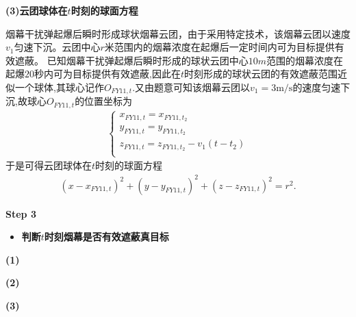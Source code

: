 \documentclass[../main.tex]{subfiles}
\begin{document}
\noindent \textbf{(3)云团球体在$t$时刻的球面方程 }
\par 烟幕干扰弹起爆后瞬时形成球状烟幕云团，由于采用特定技术，该烟幕云团以速度$v_1$匀速下沉。云团中心$r$米范围内的烟幕浓度在起爆后一定时间内可为目标提供有效遮蔽。
已知烟幕干扰弹起爆后瞬时形成的球状云团中心$10m$范围的烟幕浓度在起爆$20$秒内可为目标提供有效遮蔽,因此在$t$时刻形成的球状云团的有效遮蔽范围近似一个球体,其球心记作$O_{FY11,t}$.又由题意可知该烟幕云团以$v_1=3 \mathrm{m}/\mathrm{s}$的速度匀速下沉,故球心$O_{FY11,t}$的位置坐标为
\begin{align}
\begin{cases}
x_{FY11,t}=x_{FY11,t_2}\\
y_{FY11,t}=y_{FY11,t_2}\\
z_{FY11,t}=z_{FY11,t_2}-v_1\left( t-t_2 \right)\\
\end{cases}
\end{align}
于是可得云团球体在$t$时刻的球面方程
\begin{align}
\left( x-x_{FY11,t} \right) ^2+\left( y-y_{FY11,t} \right) ^2+\left( z-z_{FY11,t} \right) ^2=r^2.
\end{align}




\textbf{Step 3 }
\begin{itemize}
\item \textbf{判断$t$时刻烟幕是否有效遮蔽真目标}
\end{itemize}
\par \textbf{(1) }
\par \textbf{(2) }
\par \textbf{(3) }
\end{document}
